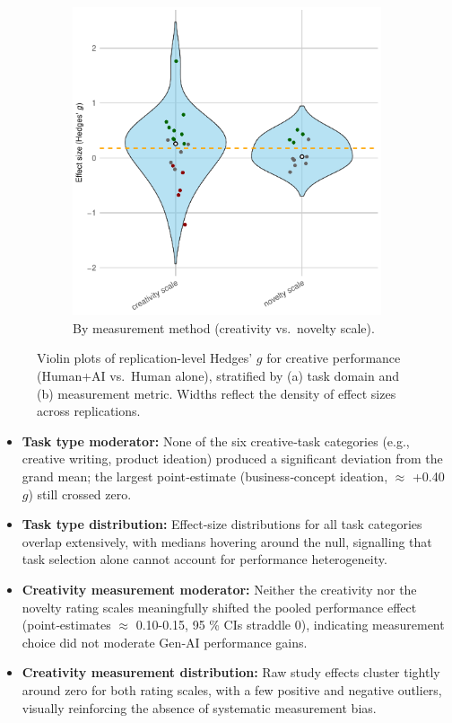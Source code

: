 \documentclass[manuscript, screen, review, acmsmall, anonymous]{acmart}
\begin{document}
\begin{figure}[H]
\begin{subfigure}[t]{0.49\linewidth}
    \includegraphics[width=\linewidth]{plot_performance_raw_violin_Creativity_Measurement}
    \caption{By measurement method (creativity vs.\ novelty scale).}
    \label{fig:performance_raw_violin_measurement}
  \end{subfigure}
  \caption{Violin plots of replication-level Hedges’ $g$ for creative performance (Human+AI vs.\ Human alone), stratified by (a) task domain and (b) measurement metric. Widths reflect the density of effect sizes across replications.}
  \label{fig:performance_raw_violins_task_measure}
\end{figure}
\begin{itemize}
  \item \textbf{Task type moderator:} None of the six creative‑task categories (e.g., creative writing, product ideation) produced a significant deviation from the grand mean; the largest point‑estimate (business‑concept ideation, $\approx$ +0.40 $g$) still crossed zero. 
  \item \textbf{Task type distribution:} Effect‑size distributions for all task categories overlap extensively, with medians hovering around the null, signalling that task selection alone cannot account for performance heterogeneity.
  \item \textbf{Creativity measurement moderator:} Neither the creativity nor the novelty rating scales meaningfully shifted the pooled performance effect (point‑estimates $\approx$ 0.10-0.15, 95 \% CIs straddle 0), indicating measurement choice did not moderate Gen‑AI performance gains.
  \item \textbf{Creativity measurement distribution:} Raw study effects cluster tightly around zero for both rating scales, with a few positive and negative outliers, visually reinforcing the absence of systematic measurement bias.
\end{itemize}
\end{document}
